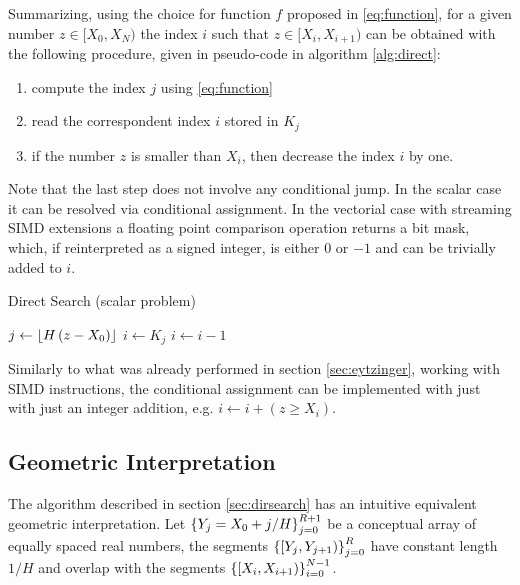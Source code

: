 \documentclass[preprint,1p,times]{elsarticle}
\begin{document}
Summarizing, using the choice for function $f$ proposed in \eqref{eq:function}, for a given number $z\in [X_0,X_N)$ the index $i$ such that $z\in [X_i,X_{i+1})$ can be obtained with the following procedure, given in pseudo-code in algorithm \ref{alg:direct}:
\begin{enumerate}
	\item compute the index $j$ using \eqref{eq:function}
	\item read the correspondent index $i$ stored in $K_j$
	\item if the number $z$ is smaller than $X_i$, then decrease the index $i$ by one.
\end{enumerate}
Note that the last step does not involve any conditional jump. In the scalar case it can be resolved via conditional assignment. In the vectorial case with streaming SIMD extensions a floating point comparison operation returns a bit mask, which, if reinterpreted as a signed integer, is either $0$ or $-1$ and can be trivially added to $i$.

\begin{algorithm}
	\caption{Direct Search (scalar problem)}
	\label{alg:direct}
	\begin{algorithmic}
		\State $j \leftarrow \left \lfloor  H \, (z-X_0)  \right \rfloor$
		\State $i \leftarrow K_j$
			\State $i \leftarrow i-1$ 
		\EndIf
		\EndFunction
	\end{algorithmic}
\end{algorithm}

Similarly to what was already performed in section \ref{sec:eytzinger}, working with SIMD instructions, the conditional assignment can be implemented with just with just an integer addition, e.g. $i \leftarrow i + (z \geq X_i)$.


\subsection{Geometric Interpretation}
\label{sec:geometric}

The algorithm described in section \eqref{sec:dirsearch} has an intuitive equivalent geometric interpretation.
Let $\left \{ Y_j=X_0+j/H \right \}_{j=0}^{R+1}$ be a conceptual array of equally spaced real numbers, the segments $\left \{ [Y_{j},Y_{j+1}) \right \}_{j=0}^{R}$ have constant length $1/H$ and overlap with the segments $\left \{ [X_{i},X_{i+1}) \right \}_{i=0}^{N-1}$.
\end{document}
